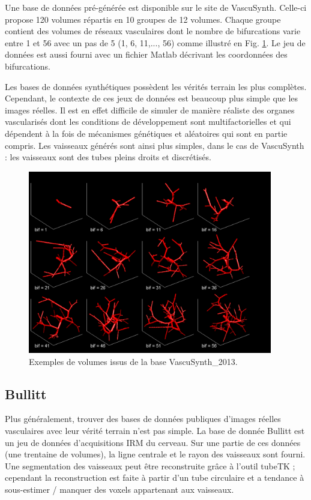 Une base de données pré-générée est disponible sur le site de VascuSynth. Celle-ci propose 120 volumes répartis en 10 groupes de 12 volumes. Chaque groupe contient des volumes de réseaux vasculaires dont le nombre de bifurcations varie entre 1 et 56 avec un pas de 5 (1, 6, 11,..., 56) comme illustré en Fig. \ref{fig:VascuSynth}. Le jeu de données est aussi fourni avec un fichier Matlab décrivant les coordonnées des bifurcations.

Les bases de données synthétiques possèdent les vérités terrain les plus complètes. Cependant, le contexte de ces jeux de données est beaucoup plus simple que les images réelles. Il est en effet difficile de simuler de manière réaliste des organes vascularisés dont les conditions de développement sont multifactorielles et qui dépendent à la fois de mécanismes génétiques et aléatoires qui sont en partie compris. Les vaisseaux générés sont ainsi plus simples, dans le cas de VascuSynth : les vaisseaux sont des tubes pleins droits et discrétisés.

\begin{figure}
    \centering
    \includegraphics[height=8cm]{Images/snapVascu.png}
    \caption{Exemples de volumes issus de la base VascuSynth\_2013.}
    \label{fig:VascuSynth}
\end{figure}

\subsection{Bullitt}

Plus généralement, trouver des bases de données publiques d'images réelles vasculaires avec leur vérité terrain n'est pas simple. La base de donnée Bullitt est un jeu de données d'acquisitions IRM du cerveau. Sur une partie de ces données (une trentaine de volumes), la ligne centrale et le rayon des vaisseaux sont fourni. Une segmentation des vaisseaux peut être reconstruite grâce à l'outil tubeTK ; cependant la reconstruction est faite à partir d'un tube circulaire et a tendance à sous-estimer / manquer des voxels appartenant aux vaisseaux.

